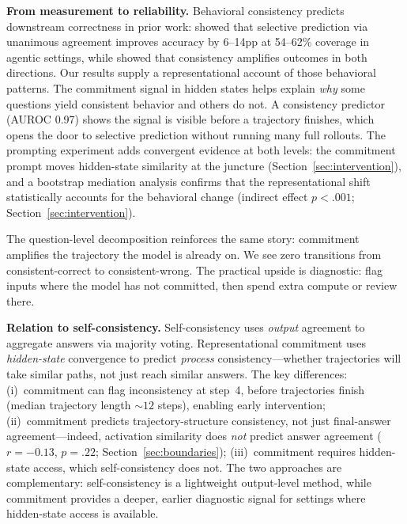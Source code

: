 \documentclass{article}
\begin{document}
\textbf{From measurement to reliability.} Behavioral consistency predicts downstream correctness in prior work: \citet{anonymous2026a} showed that selective prediction via unanimous agreement improves accuracy by 6--14pp at 54--62\% coverage in agentic settings, while \citet{anonymous2026b} showed that consistency amplifies outcomes in both directions. Our results supply a representational account of those behavioral patterns. The commitment signal in hidden states helps explain \emph{why} some questions yield consistent behavior and others do not. A consistency predictor (AUROC 0.97) shows the signal is visible before a trajectory finishes, which opens the door to selective prediction without running many full rollouts. The prompting experiment adds convergent evidence at both levels: the commitment prompt moves hidden-state similarity at the juncture (Section~\ref{sec:intervention}), and a bootstrap mediation analysis confirms that the representational shift statistically accounts for the behavioral change (indirect effect $p < .001$; Section~\ref{sec:intervention}).

The question-level decomposition reinforces the same story: commitment amplifies the trajectory the model is already on. We see zero transitions from consistent-correct to consistent-wrong. The practical upside is diagnostic: flag inputs where the model has not committed, then spend extra compute or review there.

\textbf{Relation to self-consistency.} Self-consistency \citep{wang2023selfconsistency} uses \emph{output} agreement to aggregate answers via majority voting. Representational commitment uses \emph{hidden-state} convergence to predict \emph{process} consistency---whether trajectories will take similar paths, not just reach similar answers. The key differences: (i)~commitment can flag inconsistency at step~4, before trajectories finish (median trajectory length ${\sim}12$ steps), enabling early intervention; (ii)~commitment predicts trajectory-structure consistency, not just final-answer agreement---indeed, activation similarity does \emph{not} predict answer agreement ($r = -0.13$, $p = .22$; Section~\ref{sec:boundaries}); (iii)~commitment requires hidden-state access, which self-consistency does not. The two approaches are complementary: self-consistency is a lightweight output-level method, while commitment provides a deeper, earlier diagnostic signal for settings where hidden-state access is available.
\end{document}
